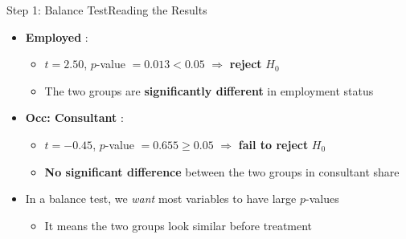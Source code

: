 \documentclass[hyperref={pdfpagelabels=false}]{beamer}
\begin{document}
\begin{frame}{Step 1: Balance Test}{Reading the Results}
	\begin{itemize}
		\item \textbf{Employed} :
		\vspace{0.2cm}
		\begin{itemize}
			\item $t = 2.50$, $p$-value $= 0.013 < 0.05$ $\Rightarrow$ \textbf{reject} $H_0$
			\vspace{0.2cm}
			\item The two groups are \textbf{significantly different} in employment status
		\end{itemize}
		\vspace{0.2cm}
		\item \textbf{Occ: Consultant} :
		\vspace{0.2cm}
		\begin{itemize}
			\item $t = -0.45$, $p$-value $= 0.655 \geq 0.05$ $\Rightarrow$ \textbf{fail to reject} $H_0$
			\vspace{0.2cm}
			\item \textbf{No significant difference} between the two groups in consultant share
		\end{itemize}
		\vspace{0.2cm}
		\item  In a balance test, we \emph{want} most variables to have large $p$-values 
        		\vspace{0.2cm}

        		\begin{itemize}

        
        \item It means the two groups look similar before treatment
        	\end{itemize}

	\end{itemize}
\end{frame}
\end{document}
